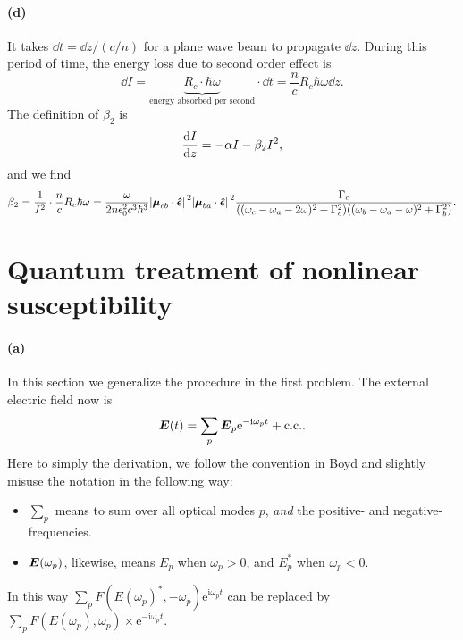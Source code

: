 \documentclass[hyperref, a4paper]{article}
\newcommand*{\ii}{\mathrm{i}}
\newcommand*{\ee}{\mathrm{e}}
\begin{document}
\paragraph*{(d)} It takes $\dd{t} = \dd{z} / (c / n)$ for a plane wave beam to propagate $\dd{z}$.
During this period of time, the energy loss due to second order effect is 
\begin{equation}
    \dd{I} = \underbrace{R_c \cdot \hbar \omega}_{\text{energy absorbed per second}} \cdot \dd{t}
    = \frac{n}{c} R_c \hbar \omega \dd{z}.
\end{equation}
The definition of $\beta_2$ is 
\begin{equation}
    \dv{I}{z} = - \alpha I - \beta_2 I^2,
\end{equation}
and we find 
\begin{equation}
    \beta_2 = \frac{1}{I^2} \cdot \frac{n}{c} R_c \hbar \omega
    = \frac{\omega}{2 n \epsilon_0^2 c^3 \hbar^3} 
    \abs*{\vb*{\mu}_{cb} \cdot \vu*{\epsilon}}^2 
    \abs*{\vb*{\mu}_{ba} \cdot \vu*{\epsilon}}^2
    \frac{\Gamma_c}{
        ((\omega_c - \omega_a - 2 \omega)^2 + \Gamma_c^2 )
        ((\omega_b - \omega_a - \omega)^2 + \Gamma_b^2)
    }.
\end{equation}

\section{Quantum treatment of nonlinear susceptibility}

\paragraph*{(a)} In this section we generalize the procedure in the first problem.
The external electric field now is  
\begin{equation}
    \vb*{E}(t) = \sum_p \vb*{E}_p \ee^{- \ii \omega_p t} + \text{c.c.}.
\end{equation}
Here to simply the derivation, 
we follow the convention in Boyd and slightly misuse the notation in the following way:
\begin{itemize}
    \item $\sum_p$ means to sum over all optical modes $p$, 
    \emph{and} the positive- and negative-frequencies.
    \item $\vb*{E}(\omega_p)$, likewise, means 
    $E_p$ when $\omega_p > 0$, 
    and $E_p^*$ when $\omega_p < 0$.
\end{itemize}
In this way $\sum_p F(E(\omega_p)^*, - \omega_p) \ee^{\ii \omega_p t}$
can be replaced by $\sum_p F(E(\omega_p), \omega_p) \times \ee^{- \ii \omega_p t}$.
\end{document}
